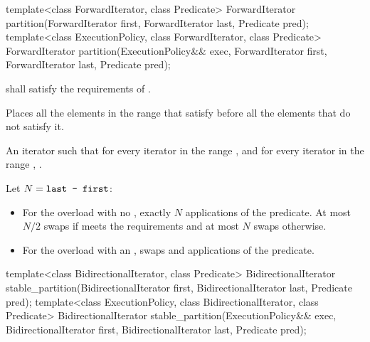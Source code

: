 %
\begin{itemdecl}
template<class ForwardIterator, class Predicate>
  ForwardIterator
    partition(ForwardIterator first, ForwardIterator last, Predicate pred);
template<class ExecutionPolicy, class ForwardIterator, class Predicate>
  ForwardIterator
    partition(ExecutionPolicy&& exec,
              ForwardIterator first, ForwardIterator last, Predicate pred);
\end{itemdecl}

\begin{itemdescr}
\pnum
\requires
{} shall satisfy the requirements of
.

\pnum
\effects Places all the elements in the range  that satisfy  before all the elements that do not satisfy it.

\pnum
\returns An iterator  such that for every iterator  in the range
 , and for every iterator  in the
range , .

\pnum
\complexity Let $N = \texttt{last - first}$:
\begin{itemize}
\item For the overload with no , exactly $N$ applications
of the predicate.  At most $N / 2$ swaps if  meets the
 requirements and at most $N$ swaps otherwise.
\item For the overload with an ,
 swaps and  applications of the predicate.
\end{itemize}

\end{itemdescr}

%
\begin{itemdecl}
template<class BidirectionalIterator, class Predicate>
  BidirectionalIterator
    stable_partition(BidirectionalIterator first, BidirectionalIterator last,
                     Predicate pred);
template<class ExecutionPolicy, class BidirectionalIterator, class Predicate>
  BidirectionalIterator
    stable_partition(ExecutionPolicy&& exec,
                     BidirectionalIterator first, BidirectionalIterator last,
                     Predicate pred);
\end{itemdecl}

